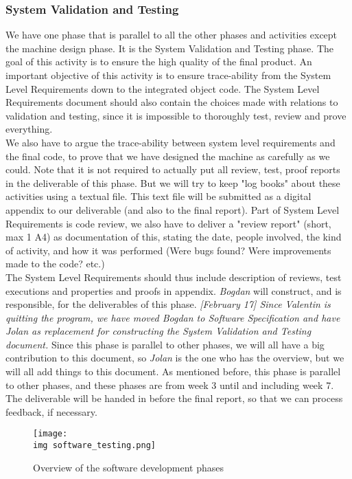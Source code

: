 \subsubsection{System Validation and Testing}
We have one phase that is parallel to all the other phases and activities except the machine design phase. It is the System Validation and Testing phase. The goal of this activity is to ensure the high quality of the final product. An important objective of this activity is to ensure trace-ability from the System Level Requirements down to the integrated object code. The System Level Requirements document should also contain the choices made with relations to validation and testing, since it is impossible to thoroughly test, review and prove everything.\\ 

We also have to argue the trace-ability between system level requirements and the final code, to prove that we have designed the machine as carefully as we could. Note that it is not required to actually put all review, test, proof reports in the deliverable of this phase. But we will try to keep "log books" about these activities using a textual file. This text file will be submitted as a digital appendix to our deliverable (and also to the final report). Part of System Level Requirements is code review, we also have to deliver a "review report" (short, max 1 A4) as documentation of this, stating the date, people involved, the kind of activity, and how it was performed (Were bugs found? Were improvements made to the code? etc.)\\ 

The System Level Requirements should thus include description of reviews, test executions and properties and proofs in appendix. \emph{Bogdan} will construct, and is responsible, for the deliverables of this phase. \emph{[February 17] Since Valentin is quitting the program, we have moved Bogdan to Software Specification and have Jolan as replacement for constructing the System Validation and Testing document.} Since this phase is parallel to other phases, we will all have a big contribution to this document, so \emph{Jolan} is the one who has the overview, but we will all add things to this document. As mentioned before, this phase is parallel to other phases, and these phases are from week 3 until and including week 7. The deliverable will be handed in before the final report, so that we can process feedback, if necessary.

\begin{figure}[ht]
	\centering
	\texttt{[image: \\img software\_testing.png]}
    \caption{Overview of the software development phases}
\end{figure}

